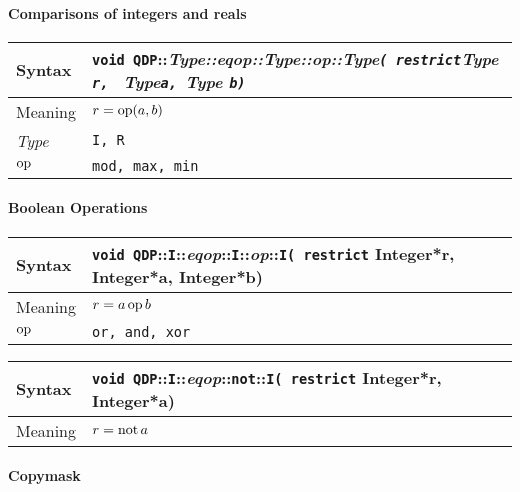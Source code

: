 \documentclass[12pt,letterpaper]{article}
\newcommand{\op}{\mathop{\rm op}}
\renewcommand{\not}{\mathop{\rm not}}
\newcommand{\tInt}{Integer}
\newcommand{\namespace}{QDP}
\newcommand{\ttdash}{{::}}
\newcommand{\itt}{\it Type}
\newcommand{\extraarg}{}
\begin{document}
\paragraph{Comparisons of integers and reals}

\begin{flushleft}
  \begin{tabular}{|l|l|}
  \hline
  Syntax      & {\tt void \namespace}\ttdash\itt\ttdash{\it eqop}\ttdash\itt\ttdash{\it op}\ttdash\itt{\tt ( restrict}{\it Type }{\tt *r, } {\it Type}{\tt *a, }{\it Type }{\tt *b\extraarg)} \\
  \hline
  Meaning     & $r = \op(a,b)$ \\
  \hline
  \itt        & {\tt I, R} \\
  \hline
  $\op$       & {\tt mod, max, min} \\
  \hline
  \end{tabular}
\end{flushleft}

\paragraph{Boolean Operations}

\begin{flushleft}
  \begin{tabular}{|l|l|}
  \hline
  Syntax      & {\tt void \namespace}\ttdash{\tt I}\ttdash{\it eqop}\ttdash{\tt I}\ttdash{\it op}\ttdash{\tt I( restrict}{ \tInt *r, \tInt *a, \tInt *b\extraarg)} \\
  \hline
  Meaning     & $r = a \op b$\\
  \hline
  $\op$       & {\tt or, and, xor} \\
  \hline
  \end{tabular}
\end{flushleft}

\begin{flushleft}
  \begin{tabular}{|l|l|}
  \hline
  Syntax      & {\tt void \namespace}\ttdash{\tt I}\ttdash{\it eqop}\ttdash{\tt not}\ttdash{\tt I( restrict}{ \tInt *r, \tInt *a)} \\
  \hline
  Meaning     & $r = \not a$\\
  \hline
  \end{tabular}
\end{flushleft}

\paragraph{Copymask}
\end{document}
